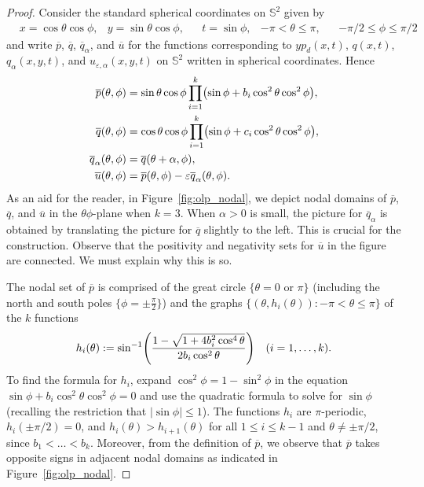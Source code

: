 \documentclass[AHL,Unicode,longabstracts,published]{cedram}
\newcommand{\sphere}{\mathbb{S}}
\newcommand{\ol}{\overline}
\renewcommand{\epsilon}{\varepsilon}
\let\originalleft\left
\let\originalright\right
\renewcommand{\left}{\mathopen{}\mathclose\bgroup\originalleft}
\renewcommand{\right}{\aftergroup\egroup\originalright}
\begin{document}
\begin{proof}
Consider the standard spherical coordinates on $\sphere^2$ given by
\begin{align}\label{spherical-coordinates}
&x = \cos \theta \cos \phi, &y = \sin \theta \cos \phi,& &t = \sin \phi, &-\pi < \theta \le \pi,& &-\pi/2 \le \phi \le \pi/2
\end{align}
and write $\ol{p}$, $\ol{q}$, $\ol{q}_\alpha$, and $\ol{u}$ for the functions corresponding to $yp_d(x,t)$, $q(x,t)$, $q_\alpha(x,y,t)$, and $u_{\epsilon,\alpha}(x,y,t)$ on $\sphere^2$ written in spherical coordinates. Hence
\begin{equation}\label{ol-defs}
\begin{split}
\ol{p}(\theta,\phi) &= \sin\theta\cos\phi\prod_{i=1}^k\left(\sin\phi + b_i\cos^2\theta\cos^2\phi \right),\\
\ol{q}(\theta,\phi) &= \cos\theta\cos\phi\prod_{i=1}^k\left(\sin\phi + c_i\cos^2\theta\cos^2\phi \right),\\
\ol{q}_\alpha(\theta,\phi) &= \ol{q}(\theta+\alpha,\phi),\\
\ol{u}(\theta,\phi) &= \ol{p}(\theta,\phi)-\epsilon \ol{q}_\alpha(\theta,\phi).
\end{split}
\end{equation}
As an aid for the reader, in Figure~\ref{fig:olp_nodal}, we depict nodal domains of $\ol{p}$, $\ol{q}$, and $\ol{u}$ in the $\theta\phi$-plane when $k=3$. When $\alpha>0$ is small, the picture for $\ol{q}_\alpha$ is obtained by translating the picture for $\ol{q}$ slightly to the left. This is crucial for the construction. Observe that the positivity and negativity sets for $\ol{u}$ in the figure are connected. We must explain why this is so.

The nodal set of $\ol{p}$ is comprised of the great circle $\{\theta=0\text{ or }\pi \}$ (including the north and south poles $\{\phi=\pm\frac{\pi}{2}\}$) and the graphs $\{(\theta,h_i(\theta)):-\pi< \theta\leq \pi\}$ of the $k$ functions
\begin{equation}\label{eqn:yp_soln_i}
h_i(\theta):=\sin^{-1}\left(\frac{1-\sqrt{1+4b_i^2\cos^4\theta}}{2b_i\cos^2\theta}\right)\quad(i=1,\dots,k).
\end{equation}
To find the formula for $h_i$, expand $\cos^2\phi=1-\sin^2\phi$ in the equation $\sin\phi+b_i\cos^2\theta\cos^2\phi=0$ and use the quadratic formula to solve for $\sin\phi$ (recalling the restriction that $|\sin\phi|\leq 1$). The functions $h_i$ are $\pi$-periodic, $h_i(\pm\pi/2)=0$, and $h_i(\theta)>h_{i+1}(\theta)$ for all $1\leq i\leq k-1$ and $\theta\neq\pm \pi/2$, since $b_1<\dots<b_k$. Moreover, from the definition of $\ol{p}$, we observe that $\ol{p}$ takes opposite signs in adjacent nodal domains as indicated in Figure~\ref{fig:olp_nodal}.


\end{proof}
\end{document}
